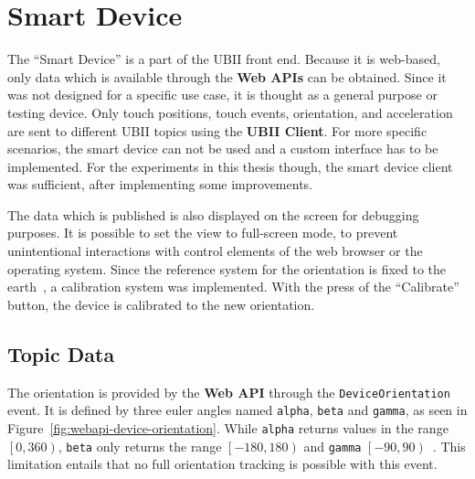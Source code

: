 \section{Smart Device}\label{section:smart-device}

The \enquote{Smart Device} is a part of the \ac{UBII} front end. Because it is web-based, only data which is available through the \textbf{Web \acp{API}} can be obtained. Since it was not designed for a specific use case, it is thought as a general purpose or testing device. Only touch positions, touch events, orientation, and acceleration are sent to different \ac{UBII} topics using the \textbf{\ac{UBII} Client}. For more specific scenarios, the smart device can not be used and a custom interface has to be implemented. For the experiments in this thesis though, the smart device client was sufficient, after implementing some improvements.

The data which is published is also displayed on the screen for debugging purposes. It is possible to set the view to full-screen mode, to prevent unintentional interactions with control elements of the web browser or the operating system. Since the reference system for the orientation is fixed to the earth~\cite[Chapter~4.1]{DevicesandSensorsWorkingGroup.2019}, a calibration system was implemented. With the press of the \enquote{Calibrate} button, the device is calibrated to the new orientation.


\subsection{Topic Data}\label{subsection:topic-data}

The orientation is provided by the \textbf{Web API} through the \lstinline{DeviceOrientation} event. It is defined by three euler angles named \lstinline{alpha}, \lstinline{beta} and \lstinline{gamma}, as seen in Figure~\ref{fig:webapi-device-orientation}.
While \lstinline{alpha} returns values in the range \(\left[0, 360\right)\), \lstinline{beta} only returns the range \(\left[-180, 180\right)\) and \lstinline{gamma} \(\left[-90, 90\right)\)~\cite[Chapter~4.1]{DevicesandSensorsWorkingGroup.2019}. %
This limitation entails that no full orientation tracking is possible with this event. 

